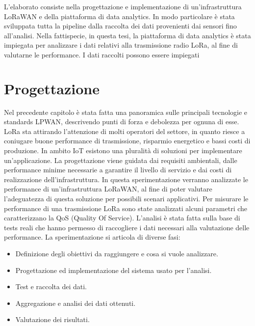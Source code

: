 \documentclass[12pt,a4paper,openright,twoside]{report}
\begin{document}
L'elaborato consiste nella progettazione e implementazione di un'infrastruttura LoRaWAN e della piattaforma di data analytics. In modo particolare \`e stata sviluppata tutta la pipeline dalla raccolta dei dati provenienti dai sensori fino all'analisi. 
Nella fattispecie, in questa tesi, la piattaforma di data analytics \`e stata impiegata per analizzare i dati relativi alla trasmissione radio LoRa, al fine di valutarne le performance.
I dati raccolti possono essere impiegati 


\chapter{Progettazione}
Nel precedente capitolo \`e stata fatta una panoramica sulle principali tecnologie e standards LPWAN, descrivendo punti di forza e debolezza per ognuna di esse.  
LoRa sta attirando l'attenzione di molti operatori del settore, in quanto riesce a coniugare buone performance di trasmissione, risparmio energetico e bassi costi di produzione.
In ambito IoT esistono una pluralit\`a di soluzioni per implementare un'applicazione. La progettazione viene guidata dai requisiti ambientali, dalle performance minime necessarie a garantire il livello di servizio e dai costi di realizzazione dell'infrastruttura.
In questa sperimentazione verranno analizzate le performance di un'infrastruttura LoRaWAN, al fine di poter valutare l'adeguatezza di questa soluzione per possibili scenari applicativi. 
Per misurare le performance di una trasmissione LoRa sono state analizzati alcuni parametri che caratterizzano la QoS (Quality Of Service). L'analisi \`e stata fatta sulla base di tests reali che hanno permesso di raccogliere i dati necessari alla valutazione delle performance. 
La sperimentazione si articola di diverse fasi:
\begin{itemize}                       
\item Definizione degli obiettivi da raggiungere e cosa si vuole analizzare.
\item Progettazione ed implementazione del sistema usato per l'analisi.
\item Test e raccolta dei dati. 
\item Aggregazione e analisi dei dati ottenuti.
\item Valutazione dei risultati.
\end{itemize}
\end{document}
